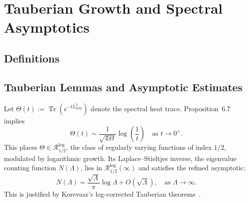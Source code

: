 \section{Tauberian Growth and Spectral Asymptotics}
\label{sec:tauberian_growth}



\subsection{Definitions}




\subsection{Tauberian Lemmas and Asymptotic Estimates}













\begin{remark}
Let \( \Theta(t) := \operatorname{Tr}(e^{-tL^2_{\mathrm{sym}}}) \) denote the spectral heat trace. Proposition~6.7 implies
\[
\Theta(t) \sim \frac{1}{\sqrt{4\pi t}}\log\left(\frac{1}{t}\right)
\quad \text{as } t \to 0^+.
\]
This places \( \Theta \in \mathcal{R}_{1/2}^{\log} \), the class of regularly varying functions of index \( 1/2 \), modulated by logarithmic growth. Its Laplace–Stieltjes inverse, the eigenvalue counting function \( N(\Lambda) \), lies in \( \mathcal{R}_{1/2}^{\log}(\infty) \) and satisfies the refined asymptotic:
\[
N(\Lambda) = \frac{\sqrt{\Lambda}}{\pi}\log \Lambda + O(\sqrt{\Lambda}),
\quad \text{as } \Lambda \to \infty.
\]
This is justified by Korevaar’s log-corrected Tauberian theorems~\cite[Ch.~III, §5]{Korevaar2004Tauberian}.
\end{remark}

